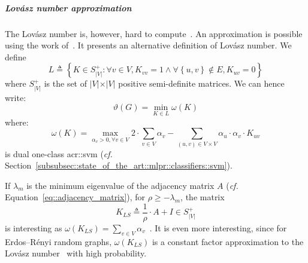                 \subparagraph{Lov\'asz number approximation}
                    The Lov\'asz number is, however, hard to compute~\parencite{johansson2014global}.
                    An approximation is possible using the work of~\textcite{jethava2013lovasz}.
                    It presents an alternative definition of Lov\'asz number.
                    We define $$L \triangleq \left\{K \in S_{\vert V \vert}^+: \forall v \in V, K_{vv} = 1 \wedge \forall \left\{u, v\right\}  \notin E, K_{uv} = 0\right\}$$ where $S_{\vert V \vert}^+$ is the set of $\vert V \vert \times \vert V \vert$ positive semi-definite matrices.
                    We can hence write:
                    \begin{equation}
                        \label{eq::lovazs_number_alternative}
                        \vartheta(G) = \min_{K \in L} \omega(K)
                    \end{equation}
                    where:
                    \begin{equation}
                        \omega(K) = \max_{\alpha_v > 0, \forall v \in V} 2\cdot \sum_{v\in V} \alpha_v - \sum_{(u, v) \in V\times V} \alpha_u \cdot \alpha_v \cdot K_{uv}
                    \end{equation}
                    is dual one-class \gls{acr::svm} (\textit{cf.} Section~\ref{subsubsec::state_of_the_art::mlpr::classifiers::svm}).

                    If $\lambda_m$ is the minimum eigenvalue of the adjacency matrix $A$ (\textit{cf.} Equation~\ref{eq::adjacency_matrix}), for $\rho\geq-\lambda_m$, the matrix
                    \begin{equation}
                        \label{eq::ls_matrix}
                        K_{LS} \triangleq \frac{1}{\rho} \cdot A + I \in S_{\vert V \vert}^+
                    \end{equation}
                    is interesting as $\omega(K_{LS}) = \sum_{v\in V} \alpha_v$~\parencite{jethava2013lovasz}.
                    It is even more interesting, since for Erdos–R\'enyi random graphs, $\omega(K_{LS})$ is a constant factor approximation to the Lov\'asz number~\parencite{jethava2013lovasz} with high probability.

